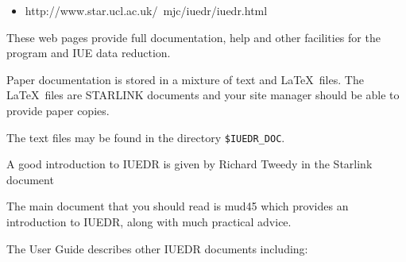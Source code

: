\begin{itemize}

\item {}
      {http://www.star.ucl.ac.uk/~mjc/iuedr/iuedr.html}

\end{itemize}

These web pages provide full documentation, help and other facilities for the
program and IUE data reduction.

Paper documentation is stored in a mixture of text and \LaTeX\ files. The
\LaTeX\ files are STARLINK documents and your site manager should be
able to provide paper copies.

The text files may be found in the directory {\tt \$IUEDR\_DOC}.

A good introduction to IUEDR is given by Richard Tweedy in the Starlink
document 

The main document that you should read is 
{mud45}{} which provides an introduction to IUEDR, along with much practical
advice.

The User Guide describes other IUEDR documents including:

